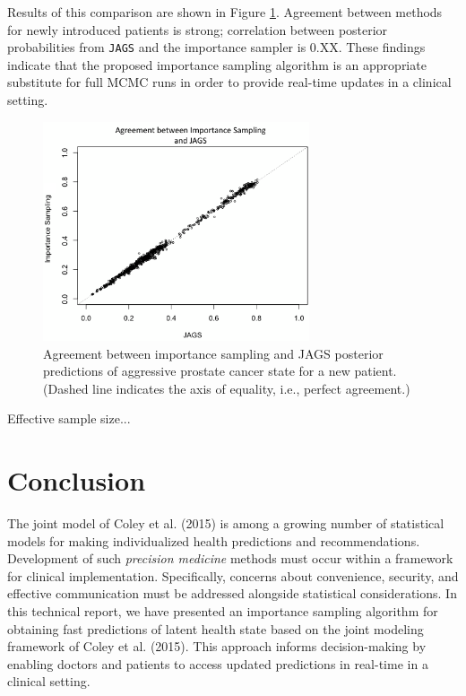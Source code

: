 \documentclass[12pt, letterpaper]{article}
\begin{document}
Results of this comparison are shown in Figure \ref{fig:jags-vs-pf}. Agreement between methods for newly introduced patients is strong; correlation between posterior probabilities from \texttt{JAGS} and the importance sampler is 0.XX. These findings indicate that the proposed importance sampling algorithm is an appropriate substitute for full MCMC runs in order to provide real-time updates in a clinical setting. 

\begin{figure}
\begin{center}
\includegraphics[width=0.7\textwidth]{2015-07-01_compare_fits_manual-edit}
\caption{Agreement between importance sampling and JAGS posterior predictions of aggressive prostate cancer state for a new patient. (Dashed line indicates the axis of equality, i.e., perfect agreement.)}
\label{fig:jags-vs-pf}
\end{center}
\end{figure}

Effective sample size...

\section{Conclusion}
The joint model of Coley et al. (2015) is among a growing number of statistical models for making individualized health predictions and recommendations. Development of such \textit{precision medicine} methods must occur within a framework for clinical implementation. Specifically, concerns about convenience, security, and effective communication must be addressed alongside statistical considerations. In this technical report, we have presented an importance sampling algorithm for obtaining fast predictions of latent health state based on the joint modeling framework of Coley et al. (2015). This approach informs decision-making by enabling doctors and patients to access updated predictions in real-time in a clinical setting. 
\end{document}
